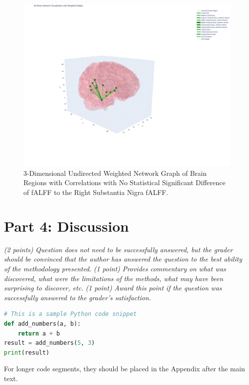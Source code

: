 \documentclass[12pt]{article}
\begin{document}
\begin{figure}[h]  %
    \centering
    \includegraphics[width=\textwidth]{"../img/3D_Plot_of_Correlated_fALFF.png"}  %
    \caption{3-Dimensional Undirected Weighted Network Graph of Brain Regions with Correlations with No Statistical Significant Difference of fALFF to the Right Substantia Nigra fALFF.}
    \label{fig:3D}  %
\end{figure}

\FloatBarrier

\newpage
\section{Part 4: Discussion}
\textit{(2 points) Question does not need to be successfully answered, but the grader should be convinced that the author has answered the question to the best ability of the methodology presented.}
\textit{(1 point) Provides commentary on what was discovered, what were the limitations of the methods, what may have been surprising to discover, etc.}
\textit{(1 point) Award this point if the question was successfully answered to the grader's satisfaction. }

\FloatBarrier

\begin{center}
\begin{lstlisting}[language=Python]
# This is a sample Python code snippet
def add_numbers(a, b):
    return a + b
result = add_numbers(5, 3)
print(result)
\end{lstlisting}
\end{center}

For longer code segments, they should be placed in the Appendix after the main text.

\end{document}
